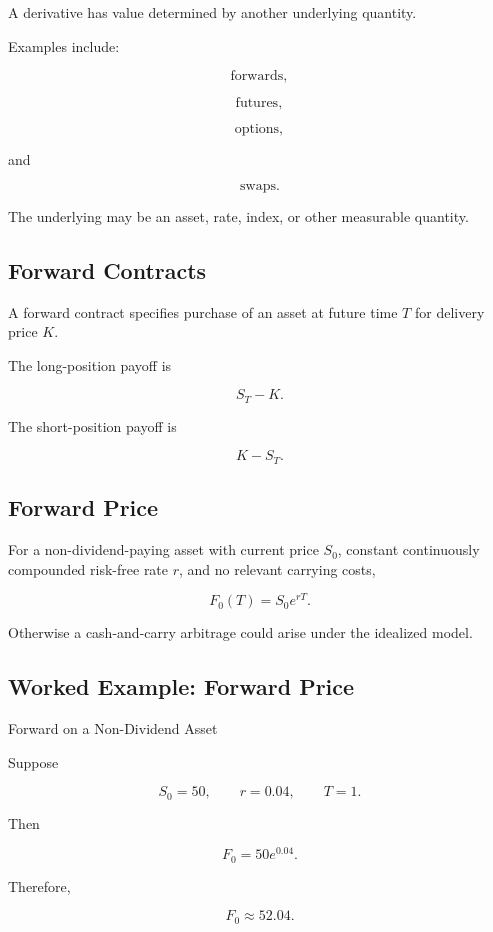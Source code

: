 A derivative has value determined by another underlying quantity.

Examples include:

\[
\boxed{
\text{forwards},
}
\]

\[
\boxed{
\text{futures},
}
\]

\[
\boxed{
\text{options},
}
\]

and

\[
\boxed{
\text{swaps}.
}
\]

The underlying may be an asset, rate, index, or other measurable quantity.

\subsection{Forward Contracts}
\label{subsec:forward-contracts}

A forward contract specifies purchase of an asset at future time \(T\) for
delivery price \(K\).

The long-position payoff is

\[
\boxed{
S_T-K.
}
\]

The short-position payoff is

\[
\boxed{
K-S_T.
}
\]

\subsection{Forward Price}
\label{subsec:forward-price}

For a non-dividend-paying asset with current price \(S_0\), constant
continuously compounded risk-free rate \(r\), and no relevant carrying costs,

\[
\boxed{
F_0(T)
=
S_0e^{rT}.
}
\]

Otherwise a cash-and-carry arbitrage could arise under the idealized model.

\subsection{Worked Example: Forward Price}
\label{subsec:worked-forward-price}

\begin{workedexamplebox}{Forward on a Non-Dividend Asset}

Suppose

\[
S_0=50,
\qquad
r=0.04,
\qquad
T=1.
\]

Then

\[
F_0
=
50e^{0.04}.
\]

Therefore,

\begin{answerbox}
\[
\boxed{
F_0\approx52.04.
}
\]
\end{answerbox}

\end{workedexamplebox}

